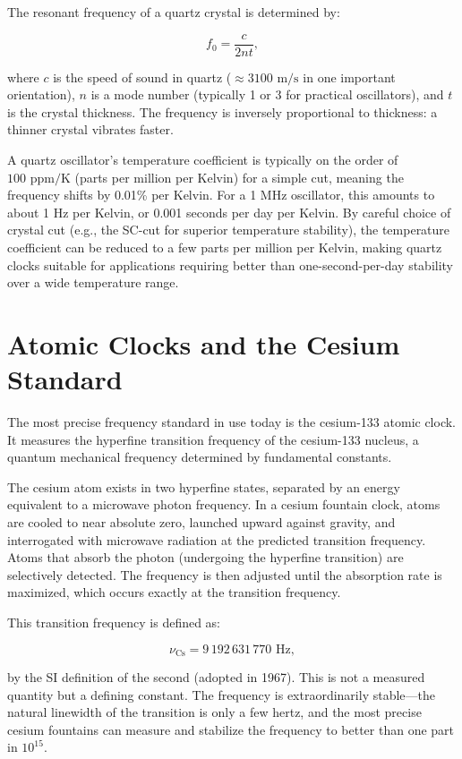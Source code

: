 The resonant frequency of a quartz crystal is determined by:

\[
  f_0 = \frac{c}{2nt},
\]

where $c$ is the speed of sound in quartz ($\approx 3100 \text{ m/s}$ in one important orientation), $n$ is a mode number (typically 1 or 3 for practical oscillators), and $t$ is the crystal thickness. The frequency is inversely proportional to thickness: a thinner crystal vibrates faster.

A quartz oscillator's temperature coefficient is typically on the order of $100 \text{ ppm}/\text{K}$ (parts per million per Kelvin) for a simple cut, meaning the frequency shifts by 0.01\% per Kelvin. For a 1 MHz oscillator, this amounts to about 1 Hz per Kelvin, or 0.001 seconds per day per Kelvin. By careful choice of crystal cut (e.g., the SC-cut for superior temperature stability), the temperature coefficient can be reduced to a few parts per million per Kelvin, making quartz clocks suitable for applications requiring better than one-second-per-day stability over a wide temperature range.

\section{Atomic Clocks and the Cesium Standard}

The most precise frequency standard in use today is the cesium-133 atomic clock. It measures the hyperfine transition frequency of the cesium-133 nucleus, a quantum mechanical frequency determined by fundamental constants.

The cesium atom exists in two hyperfine states, separated by an energy equivalent to a microwave photon frequency. In a cesium fountain clock, atoms are cooled to near absolute zero, launched upward against gravity, and interrogated with microwave radiation at the predicted transition frequency. Atoms that absorb the photon (undergoing the hyperfine transition) are selectively detected. The frequency is then adjusted until the absorption rate is maximized, which occurs exactly at the transition frequency.

This transition frequency is defined as:

\[
  \nu_{\text{Cs}} = 9\,192\,631\,770 \text{ Hz},
\]

by the SI definition of the second (adopted in 1967). This is not a measured quantity but a defining constant. The frequency is extraordinarily stable—the natural linewidth of the transition is only a few hertz, and the most precise cesium fountains can measure and stabilize the frequency to better than one part in $10^{15}$.

